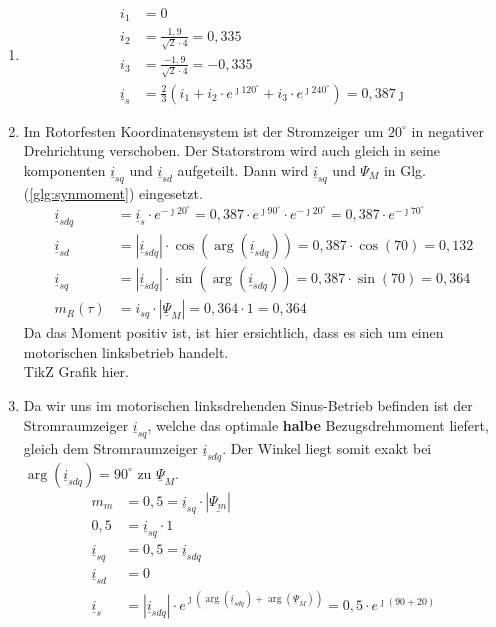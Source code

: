 \begin{solution}
\begin{enumerate}
\item 
\begin{align}
i_1 &= 0\\
i_2 &= \frac{1,9}{\sqrt{2} \cdot 4}= 0,335\\
i_3 &= \frac{-1,9}{\sqrt{2} \cdot 4}= -0,335\\
\underline{i}_s &= \frac{2}{3} \left ( i_1 + i_2 \cdot e^{\jmath 120^\circ} + i_3 \cdot e^{\jmath 240^\circ}  \right ) = 0,387 \jmath
\end{align}
\item Im Rotorfesten Koordinatensystem ist der Stromzeiger um $20^\circ$ in negativer Drehrichtung verschoben. Der Statorstrom wird auch gleich in seine komponenten $\underline{i}_{sq}$ und $\underline{i}_{sd}$ aufgeteilt. Dann wird $\underline{i}_{sq}$ und $\Psi_M$ in Glg.(\ref{glg:synmoment}) eingesetzt.
\begin{align}
\underline{i}_{sdq} & = \underline{i}_s \cdot e^{-\jmath 20 ^\circ} = 0,387 \cdot e^{\jmath 90 ^\circ} \cdot e^{-\jmath 20 ^\circ} = 0,387 \cdot e^{-\jmath 70 ^\circ} \\
\underline{i}_{sd} & = |\underline{i}_{sdq}| \cdot \cos(\arg(\underline{i}_{sdq})) = 0,387 \cdot \cos(70) = 0,132 \\
\underline{i}_{sq} & = |\underline{i}_{sdq}| \cdot \sin(\arg(\underline{i}_{sdq})) = 0,387 \cdot \sin(70) = 0,364 \\
m_R(\tau)& =  i_{sq} \cdot | \underline{\Psi}_M|= 0,364\cdot 1 = 0,364
\end{align}
Da das Moment positiv ist, ist hier ersichtlich, dass es sich um einen motorischen linksbetrieb handelt.\\
TikZ Grafik hier.
\item Da wir uns im motorischen linksdrehenden Sinus-Betrieb befinden ist der Stromraumzeiger $\underline{i}_{sq}$, welche das optimale \textbf{halbe} Bezugsdrehmoment liefert, gleich dem Stromraumzeiger $\underline{i}_{sdq}$. Der Winkel liegt somit exakt bei $\arg(\underline{i}_{sdq})=90^\circ$ zu $\underline{\Psi}_M$.
\begin{align}
m_m &= 0,5 = \underline{i}_{sq} \cdot |\underline{\Psi_m}|\\
0,5 &= \underline{i}_{sq} \cdot 1\\
\underline{i}_{sq} &= 0,5 = \underline{i}_{sdq} \\
\underline{i}_{sd} &= 0\\
\underline{i}_{s} &= |\underline{i}_{sdq}| \cdot e^{\jmath (\arg(\underline{i}_{sdq}) + \arg(\underline{\Psi}_{M}))}= 0,5 \cdot e^{\jmath (90 + 20)}

\end{align}
\end{enumerate}
\end{solution}
